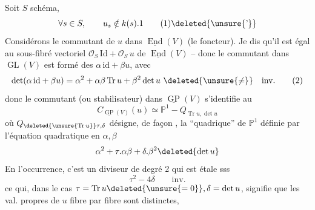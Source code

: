 Soit $S$ schéma,  
\[
 \forall s\in S,\qquad u_s\notin k(s).1 \tag*{(1)\deleted{\unsure{'}}}
\]
Considérons le commutant de $u$ dans $\underline{\operatorname{End}}(V)$ (le foncteur). Je dis qu'il est égal au sous-fibré vectoriel $\mathcal O_S\,\mathrm{Id}+\mathcal O_S\,u$ de $\underline{\operatorname{End}}(V)$ -- donc le commutant dans $\operatorname{GL}(V)$ est formé des $\alpha\,\mathrm{id}+\beta u$, avec
\[
 \det(\alpha\,\mathrm{id}+\beta u)=\alpha^2+\alpha\beta\operatorname{Tr}u+\beta^2\det u\ \deleted{\unsure{\ne}}\quad\text{inv.} \tag*{(2)}
\]
donc le commutant (ou stabilisateur) dans $\underline{\operatorname{GP}}(V)$ s'identifie au
\[
 C_{\underline{\operatorname{GP}}(V)}(u)\simeq\mathbb P^1-Q_{\operatorname{Tr}u,\det u}
\]
où $Q_{\deleted{\unsure{\operatorname{Tr}u}}\tau,\delta}$ désigne, de façon , la ``quadrique'' de $\mathbb P^1$ définie par l'équation quadratique en $\alpha,\beta$
\[
 \alpha^2+\tau.\alpha\beta+\delta.\beta^2\deleted{\det u}
\]
En l'occurrence, c'est un diviseur de degré 2  qui est étale sss
\[
 \tau^2-4\delta\qquad\text{inv.}
\]
ce qui, dans le cas $\tau=\operatorname{Tr}u\deleted{\unsure{=0}},\delta=\det u$, signifie que les val. propres de $u$ fibre par fibre sont distinctes,
